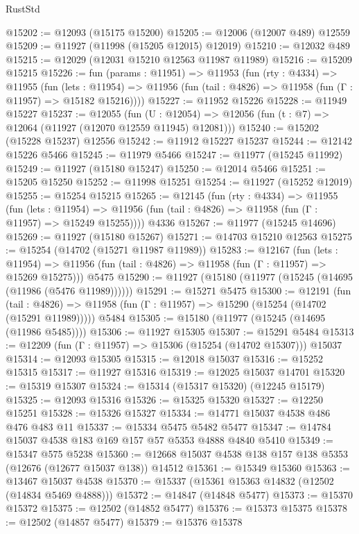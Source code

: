 \begin{lexlean}{RustStd}
\begin{coremodule}
@15202 := @12093 (@15175 @15200)
@15205 := @12006 (@12007 @489) @12559
@15209 := @11927 (@11998 (@15205 @12015) @12019)
@15210 := @12032 @489
@15215 := @12029 (@12031 @15210 @12563 @11987 @11989)
@15216 := @15209 @15215
@15226 := fun (params : @11951) =>
  @11953
    (fun (rty : @4334) =>
    @11955
      (fun (lets : @11954) =>
      @11956 (fun (tail : @4826) => @11958 (fun (Γ : @11957) => @15182 @15216))))
@15227 := @11952 @15226
@15228 := @11949 @15227
@15237 := @12055
    (fun (U : @12054) => @12056 (fun (t : @7) => @12064 (@11927 (@12070 @12559 @11945) @12081)))
@15240 := @15202 (@15228 @15237) @12556
@15242 := @11912 @15227 @15237
@15244 := @12142 @15226 @5466
@15245 := @11979 @5466
@15247 := @11977 (@15245 @11992)
@15249 := @11927 (@15180 @15247)
@15250 := @12014 @5466
@15251 := @15205 @15250
@15252 := @11998 @15251
@15254 := @11927 (@15252 @12019)
@15255 := @15254 @15215
@15265 := @12145
    (fun (rty : @4334) =>
    @11955
      (fun (lets : @11954) =>
      @11956 (fun (tail : @4826) => @11958 (fun (Γ : @11957) => @15249 @15255))))
    @4336
@15267 := @11977 (@15245 @14696)
@15269 := @11927 (@15180 @15267)
@15271 := @14703 @15210 @12563
@15275 := @15254 (@14702 (@15271 @11987 @11989))
@15283 := @12167
    (fun (lets : @11954) =>
    @11956 (fun (tail : @4826) => @11958 (fun (Γ : @11957) => @15269 @15275)))
    @5475
@15290 := @11927 (@15180 (@11977 (@15245 (@14695 (@11986 (@5476 @11989))))))
@15291 := @15271 @5475
@15300 := @12191
    (fun (tail : @4826) => @11958 (fun (Γ : @11957) => @15290 (@15254 (@14702 (@15291 @11989)))))
    @5484
@15305 := @15180 (@11977 (@15245 (@14695 (@11986 @5485))))
@15306 := @11927 @15305
@15307 := @15291 @5484
@15313 := @12209 (fun (Γ : @11957) => @15306 (@15254 (@14702 @15307))) @15037
@15314 := @12093 @15305
@15315 := @12018 @15037
@15316 := @15252 @15315
@15317 := @11927 @15316
@15319 := @12025 @15037 @14701
@15320 := @15319 @15307
@15324 := @15314 (@15317 @15320) (@12245 @15179)
@15325 := @12093 @15316
@15326 := @15325 @15320
@15327 := @12250 @15251
@15328 := @15326 @15327
@15334 := @14771 @15037 @4538 @486 @476 @483 @11
@15337 := @15334 @5475 @5482 @5477
@15347 := @14784 @15037 @4538 @183 @169 @157 @57 @5353 @4888 @4840 @5410
@15349 := @15347 @575 @5238
@15360 := @12668 @15037 @4538 @138 @157 @138 @5353 (@12676 (@12677 @15037 @138)) @14512
@15361 := @15349 @15360
@15363 := @13467 @15037 @4538
@15370 := @15337 (@15361 @15363 @14832 (@12502 (@14834 @5469 @4888)))
@15372 := @14847 (@14848 @5477)
@15373 := @15370 @15372
@15375 := @12502 (@14852 @5477)
@15376 := @15373 @15375
@15378 := @12502 (@14857 @5477)
@15379 := @15376 @15378

\end{coremodule}
\end{lexlean}
